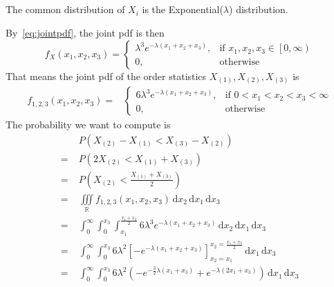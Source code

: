 \documentclass[hwnumber=3]{mthe353answer}
\begin{document}
\begin{questions}
\begin{parts}
      \part{}
      The common distribution of \(X_i\) is the Exponential(\(\lambda\))
      distribution.
      \begin{solution}
        By~\eqref{eq:jointpdf}, the joint pdf is then
        \begin{equation*}
          f_X(x_1, x_2, x_3) =
          \begin{cases}
            \lambda^3 e^{-\lambda(x_1 + x_2 + x_3)}, & \text{if } x_1, x_2, x_3 \in \left[0, \infty\right)\\
            0, & \text{otherwise}
          \end{cases}
        \end{equation*}
        That means the joint pdf of the order statistics \(X_{(1)}, X_{(2)},
        X_{(3)}\) is
        \begin{align*}
          f_{1, 2, 3}(x_1, x_2, x_3) =&
          \begin{cases}
            6\lambda^3 e^{-\lambda(x_1 + x_2 + x_3)}, & \text{if } 0 < x_1 < x_2 < x_3 < \infty\\
            0, & \text{otherwise}
          \end{cases}
        \end{align*}
        The probability we want to compute is
        \begin{align*}
          &\; P(X_{(2)} - X_{(1)} < X_{(3)} - X_{(2)})\\
          =&\; P(2X_{(2)} < X_{(1)} + X_{(3)})\\
          =&\; P(X_{(2)} < \frac{X_{(1)} + X_{(3)}}{2})\\
          =&\; \iiint \limits_{\mathbb{R}} f_{1, 2, 3}(x_1, x_2, x_3)
            \, \textrm{d}x_2 \, \textrm{d}x_1 \, \textrm{d}x_3\\
          =&\; \int_0^\infty \int_0^{x_3} \int_{x_1}^{\frac{x_1 + x_3}{2}} 6\lambda^3 e^{-\lambda(x_1 + x_2 + x_3)}
            \, \textrm{d}x_2 \, \textrm{d}x_1 \, \textrm{d}x_3\\
          =&\; \int_0^\infty \int_0^{x_3} 6\lambda^2\left[-e^{-\lambda(x_1+x_2+x_3)}\right]_{x_2=x_1}^{x_2=\frac{x_1+x_3}{2}}
            \, \textrm{d}x_1 \, \textrm{d}x_3\\
          =&\; \int_0^\infty \int_0^{x_3} 6\lambda^2\left(-e^{-\frac{3}{2}\lambda(x_1+x_3)} + e^{-\lambda(2x_1+x_3)}\right)
            \, \textrm{d}x_1 \, \textrm{d}x_3\\

\end{align*}
\end{solution}
\end{parts}
\end{questions}
\end{document}
